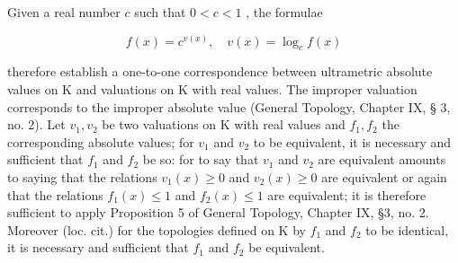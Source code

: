 Given a real number \(c\) such that \(0 < c < 1\) , the formulae

\[
f (x) = c ^ {v (x)}, \quad v (x) = \log_ {c} f (x)
\]

therefore establish a one-to-one correspondence between ultrametric absolute values on K and valuations on K with real values. The improper valuation corresponds to the improper absolute value (General Topology, Chapter IX, § 3, no. 2). Let \(v_{1}, v_{2}\) be two valuations on K with real values and \(f_{1}, f_{2}\) the corresponding absolute values; for \(v_{1}\) and \(v_{2}\) to be equivalent, it is necessary and sufficient that \(f_{1}\) and \(f_{2}\) be so: for to say that \(v_{1}\) and \(v_{2}\) are equivalent amounts to saying that the relations \(v_{1}(x) \geqslant 0\) and \(v_{2}(x) \geqslant 0\) are equivalent or again that the relations \(f_{1}(x) \leqslant 1\) and \(f_{2}(x) \leqslant 1\) are equivalent; it is therefore sufficient to apply Proposition 5 of General Topology, Chapter IX, §3, no. 2. Moreover (loc. cit.) for the topologies defined on K by \(f_{1}\) and \(f_{2}\) to be identical, it is necessary and sufficient that \(f_{1}\) and \(f_{2}\) be equivalent.


